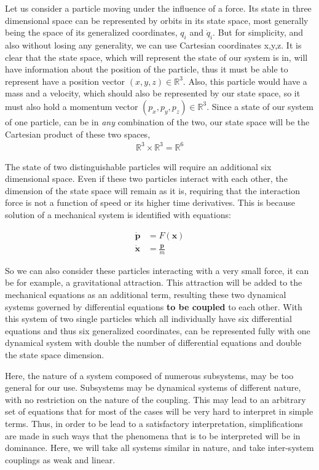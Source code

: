 \begin{example}
Let us consider a particle moving under the influence of a force. Its state in three dimensional space can be represented by orbits in its state space, most generally being the space of its generalized coordinates, $q_i$ and $ \dot{q}_i$. But for simplicity, and also without losing any generality, we can use Cartesian coordinates x,y,z. It is clear that the state space, which will represent the state of our system is in, will have information about the position of the particle, thus it must be able to represent have a position vector $(x,y,z) \in \mathbb{R}^3$. Also, this particle would have a mass and a velocity, which should also be represented by our state space, so it must also hold a momentum vector $(p_x,p_y,p_z) \in \mathbb{R}^3$. Since a state of our system of one particle, can be in \emph{any} combination of the two, our state space will be the Cartesian product of these two spaces,
\begin{align}
\mathbb{R}^3 \times \mathbb{R}^3=\mathbb{R}^6
\end{align}

The state of two distinguishable particles will require an additional six dimensional space. Even if these two particles interact with each other, the dimension of the state space will remain as it is, requiring that the interaction force is not a function of speed or its higher time derivatives. This is because solution of a mechanical system is identified with equations:

\begin{align}
\dot{\mathbf{p}} &= F(\mathbf{x})\\
\dot{\mathbf{x}} &= \frac{\mathbf{p}}{m}
\end{align}

So we can also consider these particles interacting with a very small force, it can be for example, a gravitational attraction. This attraction will be added to the mechanical equations as an additional term, resulting these two dynamical systems governed by differential equations \textbf{to be coupled} to each other. With this system of two single particles which all individually have six differential equations and thus six generalized coordinates, can be represented fully with one dynamical system with double the number of differential equations and double the state space dimension.

Here, the nature of a system composed of numerous subsystems, may be too general for our use. Subsystems may be dynamical systems of different nature, with no restriction on the nature of the coupling. This may lead to an arbitrary set of equations that for most of the cases will be very hard to interpret in simple terms. Thus, in order to be lead to a satisfactory interpretation, simplifications are made in such ways that the phenomena that is to be interpreted will be in dominance. Here, we will take all systems similar in nature, and take inter-system couplings as weak and linear.

\end{example}

